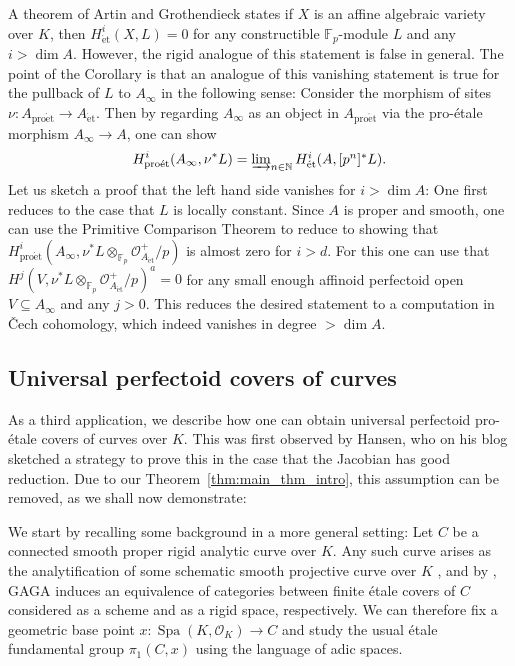 \documentclass[10pt,oneside]{amsart}
\theoremstyle{definition}
\newcommand{\Spa}{\operatorname{Spa}}
\newcommand{\et}{\operatorname{\acute{e}t}}
\newcommand{\proet}{\operatorname{pro\acute{e}t}}
\renewcommand{\O}{\mathcal{O}}
\newcommand{\N}{\mathbb{N}}
\newcommand{\F}{\mathbb{F}}
\begin{document}
	A theorem of Artin and Grothendieck states if $X$ is an affine algebraic variety over $K$, then $H_{\et}^i(X,L)=0$ for any constructible $\mathbb F_p$-module $L$ and any $i>\dim A$. However, the rigid analogue of this statement is false in general. The point of the Corollary is that an analogue of this vanishing statement is true for the pullback of $L$ to $A_\infty$ in the following sense: Consider the morphism of sites $\nu\colon A_{\proet}\to A_{\et}$. Then by regarding $A_\infty$ as an object in $A_{\proet}$ via the pro-\'etale morphism $A_\infty\to A$, one can show
	\[H^i_{\proet}(A_\infty,\nu^{\ast}L)=\textstyle\varinjlim_{n\in\N} H^i_{\et}(A,[p^n]^{\ast}L). \]
	Let us sketch a proof that the left hand side vanishes  for $i>\dim A$: One first reduces to the case that $L$ is locally constant.
	Since $A$ is proper and smooth, one can use the Primitive Comparison Theorem \cite[Theorem~5.1]{p-adic_Hodge} \cite[Theorem~3.13]{survey} to reduce to showing that $H^i_{\proet}(A_\infty,\nu^{\ast}L\otimes_{\F_p} \O_{A_{\et}}^+/p)$ is almost zero for $i>d$. For this one can use that $H^j(V,\nu^{\ast}L\otimes_{\F_p} \O_{A_{\et}}^+/p)^a=0$ for any small enough affinoid perfectoid open $V\subseteq A_\infty$ and any $j>0$. This reduces the desired statement to a computation in \v{C}ech cohomology, which indeed vanishes in degree $>\dim A$.
	\subsection{Universal perfectoid covers of curves}
	
As a third application, we describe how one can obtain universal perfectoid pro-\'etale covers of curves over $K$. This was first observed by Hansen, who on his blog sketched a strategy to prove this in the case that the Jacobian has good reduction. Due to our Theorem~\ref{thm:main_thm_intro}, this assumption can be removed, as we shall now demonstrate:
	
	We start by recalling some background in a more general setting: Let $C$ be a connected smooth proper rigid analytic curve over $K$. Any such curve arises as the analytification of some schematic smooth projective curve over $K$ \cite[Theorem 1.8.1]{Lut}, and by \cite[Theorem 3.1]{LutRiemann}, GAGA induces an equivalence of categories between finite \'etale covers of $C$ considered as a scheme and as a rigid  space, respectively. We can therefore fix a geometric base point $x:\Spa({K},\O_{{K}})\to C$ and study the usual \'etale fundamental group $\pi_1(C,x)$ using the language of adic spaces. 
	
\end{document}
